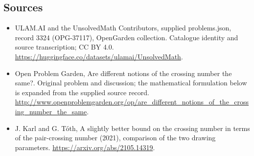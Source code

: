 \documentclass[11pt,a4paper]{article}
\begin{document}
\subsection{Sources}
\begin{itemize}
\item[S1] ULAM.AI and the UnsolvedMath Contributors, supplied problems.json, record 3324 (OPG-37117), OpenGarden collection. Catalogue identity and source transcription; CC BY 4.0.
\url{https://huggingface.co/datasets/ulamai/UnsolvedMath}.
\item[S2] Open Problem Garden, Are different notions of the crossing number the same?. Original problem and discussion; the mathematical formulation below is expanded from the supplied source record.
\url{http://www.openproblemgarden.org/op/are_different_notions_of_the_crossing_number_the_same}.
\item[S3] J. Karl and G. Tóth, A slightly better bound on the crossing number in terms of the pair-crossing number (2021), comparison of the two drawing parameters.
\url{https://arxiv.org/abs/2105.14319}.

\end{itemize}
\end{document}

